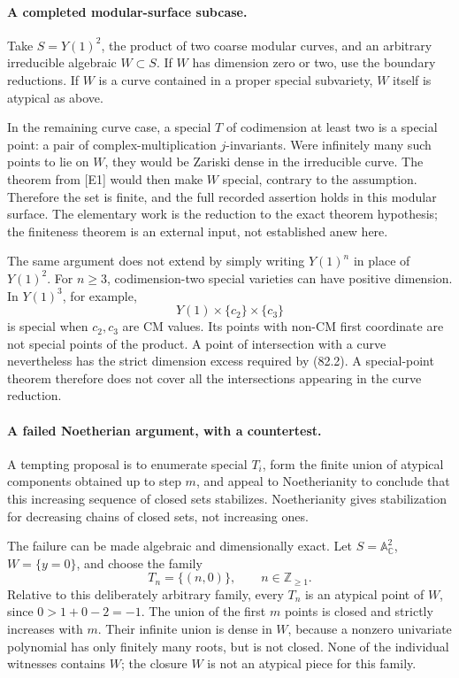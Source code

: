 \documentclass[11pt]{article}
\begin{document}
\paragraph{A completed modular-surface subcase.}
Take $S=Y(1)^2$, the product of two coarse modular curves, and an arbitrary irreducible algebraic $W\subset S$. If $W$ has dimension zero or two, use the boundary reductions. If $W$ is a curve contained in a proper special subvariety, $W$ itself is atypical as above.

In the remaining curve case, a special $T$ of codimension at least two is a special point: a pair of complex-multiplication $j$-invariants. Were infinitely many such points to lie on $W$, they would be Zariski dense in the irreducible curve. The theorem from [E1] would then make $W$ special, contrary to the assumption. Therefore the set is finite, and the full recorded assertion holds in this modular surface. The elementary work is the reduction to the exact theorem hypothesis; the finiteness theorem is an external input, not established anew here.

The same argument does not extend by simply writing $Y(1)^n$ in place of $Y(1)^2$. For $n\ge3$, codimension-two special varieties can have positive dimension. In $Y(1)^3$, for example,
\[
 Y(1)\times\{c_2\}\times\{c_3\}
\]
is special when $c_2,c_3$ are CM values. Its points with non-CM first coordinate are not special points of the product. A point of intersection with a curve nevertheless has the strict dimension excess required by (82.2). A special-point theorem therefore does not cover all the intersections appearing in the curve reduction.

\paragraph{A failed Noetherian argument, with a countertest.}
A tempting proposal is to enumerate special $T_i$, form the finite union of atypical components obtained up to step $m$, and appeal to Noetherianity to conclude that this increasing sequence of closed sets stabilizes. Noetherianity gives stabilization for decreasing chains of closed sets, not increasing ones.

The failure can be made algebraic and dimensionally exact. Let $S=\mathbb A^2_{\mathbb C}$, $W=\{y=0\}$, and choose the family
\[
 T_n=\{(n,0)\},\qquad n\in\mathbb Z_{\ge1}.
\]
Relative to this deliberately arbitrary family, every $T_n$ is an atypical point of $W$, since $0>1+0-2=-1$. The union of the first $m$ points is closed and strictly increases with $m$. Their infinite union is dense in $W$, because a nonzero univariate polynomial has only finitely many roots, but is not closed. None of the individual witnesses contains $W$; the closure $W$ is not an atypical piece for this family.
\end{document}
